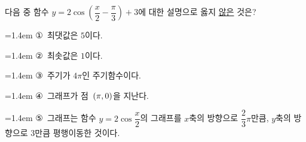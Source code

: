 다음 중 함수 $y=2\cos\left(\dfrac{x}{2}-\dfrac{\pi}{3}\right)+3$에 대한 설명으로 옳지 \underline{않은} 것은?
\par\medskip\par\noindent\hangindent=1.4em {\small ①}\ 최댓값은 $5$이다.\par\noindent\hangindent=1.4em {\small ②}\ 최솟값은 $1$이다.\par\noindent\hangindent=1.4em {\small ③}\ 주기가 $4\pi$인 주기함수이다.\par\noindent\hangindent=1.4em {\small ④}\ 그래프가 점~$(\pi{,}\mkern3mu\mathopen{}0)$을 지난다.\par\noindent\hangindent=1.4em {\small ⑤}\ 그래프는 함수 $y=2\cos\dfrac{x}{2}$의 그래프를 $x$축의 방향으로 $\dfrac{2}{3}\pi$만큼, $y$축의 방향으로 $3$만큼 평행이동한 것이다.\par\medskip
